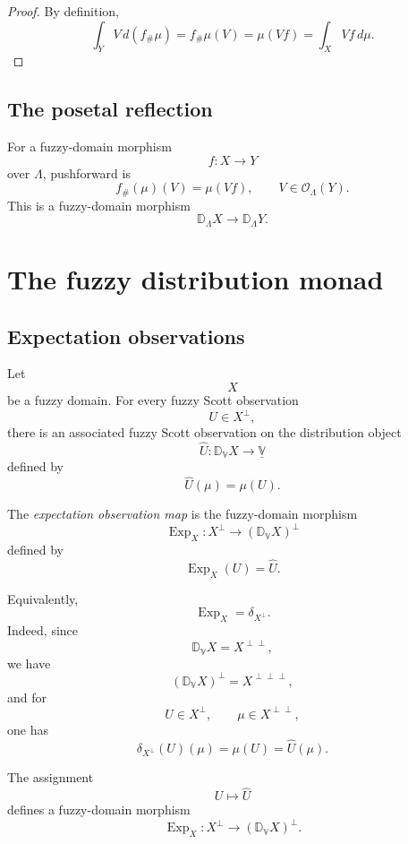 \begin{proof}
By definition,
\[
    \int_Y V\,d(f_{\#}\mu)
    =
    f_{\#}\mu(V)
    =
    \mu(Vf)
    =
    \int_X Vf\,d\mu.
\]
\end{proof}

\subsection{The posetal reflection}
\label{subsec:pushforward-posetal}

For a fuzzy-domain morphism
\[
    f:X\to Y
\]
over \(\Lambda\), pushforward is
\[
    f_{\#}(\mu)(V)
    =
    \mu(Vf),
    \qquad
    V\in\mathcal O_{\Lambda}(Y).
\]
This is a fuzzy-domain morphism
\[
    \mathbb D_{\Lambda}X\to\mathbb D_{\Lambda}Y.
\]

\section{The fuzzy distribution monad}
\label{sec:fuzzy-distribution-monad}

\subsection{Expectation observations}
\label{subsec:expectation-observations}

Let
\[
    X
\]
be a fuzzy domain.  For every fuzzy Scott observation
\[
    U\in X^{\perp},
\]
there is an associated fuzzy Scott observation on the distribution object
\[
    \widehat U:\mathbb D_{\mathbb V}X\to\underline{\mathbb V}
\]
defined by
\[
    \widehat U(\mu)=\mu(U).
\]

\begin{definition}
\label{def:expectation-observation-map}
The \emph{expectation observation map} is the fuzzy-domain morphism
\[
    \operatorname{Exp}_X:
    X^{\perp}\to(\mathbb D_{\mathbb V}X)^{\perp}
\]
defined by
\[
    \operatorname{Exp}_X(U)=\widehat U.
\]
\end{definition}

Equivalently,
\[
    \operatorname{Exp}_X
    =
    \delta_{X^{\perp}}.
\]
Indeed, since
\[
    \mathbb D_{\mathbb V}X
    =
    X^{\perp\perp},
\]
we have
\[
    (\mathbb D_{\mathbb V}X)^{\perp}
    =
    X^{\perp\perp\perp},
\]
and for
\[
    U\in X^{\perp},
    \qquad
    \mu\in X^{\perp\perp},
\]
one has
\[
    \delta_{X^{\perp}}(U)(\mu)
    =
    \mu(U)
    =
    \widehat U(\mu).
\]

\begin{proposition}
\label{prop:expectation-observations-are-scott}
The assignment
\[
    U\longmapsto\widehat U
\]
defines a fuzzy-domain morphism
\[
    \operatorname{Exp}_X:
    X^{\perp}\to(\mathbb D_{\mathbb V}X)^{\perp}.
\]
\end{proposition}

